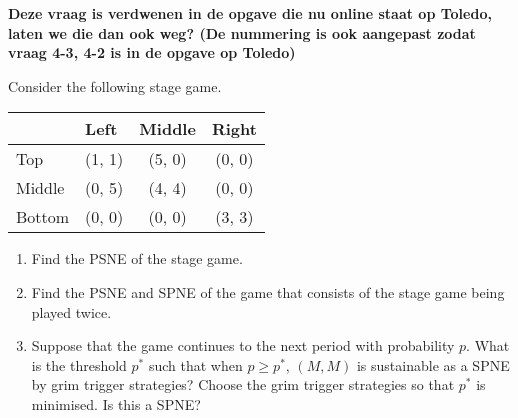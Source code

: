 \documentclass[../main.tex]{subfiles}
\begin{document}
\begin{question}
\textbf{Deze vraag is verdwenen in de opgave die nu online staat op Toledo, laten we die dan ook weg? (De nummering is ook aangepast zodat vraag 4-3, 4-2 is in de opgave op Toledo)}
\end{question}

\begin{solution}
\end{solution}

\begin{question}
Consider the following stage game.
\begin{table}[h]
\centering
\begin{tabular}{lccc}
                            & \multicolumn{1}{l}{Left} & \multicolumn{1}{l}{Middle} & \multicolumn{1}{l}{Right} \\ \hline
\multicolumn{1}{l|}{Top}    & (1, 1)                   & (5, 0)                     & (0, 0)                    \\
\multicolumn{1}{l|}{Middle} & (0, 5)                   & (4, 4)                     & (0, 0)                    \\
\multicolumn{1}{l|}{Bottom}  & (0, 0)                   & (0, 0)                     & (3, 3)                   
\end{tabular}
\end{table}

\begin{enumerate}
  \item Find the PSNE of the stage game.
  \item Find the PSNE and SPNE of the game that consists of the stage game being played twice.
  \item Suppose that the game continues to the next period with probability $p$. What is the threshold $p^*$ such that when $p \geq p^*$, $(M,M)$ is sustainable as a SPNE by grim trigger strategies? Choose the grim trigger strategies so that $p^*$ is minimised. Is this a SPNE?
\end{enumerate}

\end{question}
\end{document}
